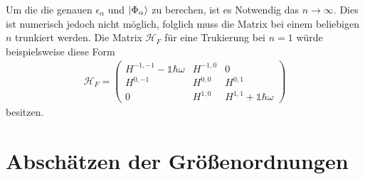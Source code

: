 Um die die genauen $\epsilon_{\alpha}$ und $\ket{\Phi_\alpha}$ zu berechen, ist es Notwendig das $n\rightarrow\infty $.
Dies ist numerisch jedoch nicht möglich, folglich muss die Matrix bei einem beliebigen $n$ trunkiert werden.
Die Matrix $\mathcal{H}_F$ für eine Trukierung bei $n=1$ würde beispielsweise diese Form
\begin{align}
  \mathcal{H}_F=\begin{pmatrix}
  H^{-1,-1}-\mathbb{1}\hbar\omega &  H^{-1,0} &   0 \\
  H^{0,-1}               &  H^{0,0}  &H^{0,1}                  \\
      0                  &  H^{1,0}  & H^{1,1}+\mathbb{1}\hbar\omega
\end{pmatrix}
\end{align}
besitzen.

\section{Abschätzen der Größenordnungen}
